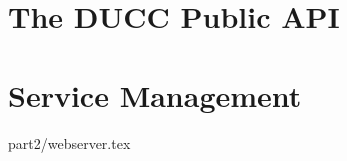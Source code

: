 \ifpdf
\else
{}
\fi

\chapter{The DUCC Public API}
\label{chap:api}


\ifpdf
\else
{}
\fi
\chapter{Service Management}
\label{chap:services}





 {part2/webserver.tex}

